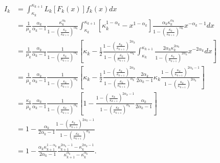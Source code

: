 \documentclass[12pt]{article}
\begin{document}
\begin{align*}
  I_k & = \int_{\kappa_k}^{\kappa_{k+1}}L_k[F_k(x)]f_k(x)dx \\
      & = \frac{1}{\mu_k}\frac{\alpha_k}{\alpha_k - 1}\frac{\kappa_k^{\alpha_k}}{1 - \left(\frac{\kappa_k}{\kappa_{k+1}}\right)^{\alpha_k}}\int_{\kappa_k}^{\kappa_{k+1}}\left[\kappa_k^{1-\alpha_k} - x^{1 - \alpha_k}\right]\frac{\alpha_k\kappa_k^{\alpha_k}}{1 - \left(\frac{\kappa_k}{\kappa_{k+1}}\right)^{\alpha_k}}x^{-\alpha_k - 1}dx \\
      & = \frac{1}{\mu_k}\frac{\alpha_k}{\alpha_k - 1}\frac{1}{1 - \left(\frac{\kappa_k}{\kappa_{k+1}}\right)^{\alpha_k}}\left[\kappa_k - \frac{1}{2}\frac{1 - \left(\frac{\kappa_k}{\kappa_{k+1}}\right)^{2\alpha_k}}{1 - \left(\frac{\kappa_k}{\kappa_{k+1}}\right)^{\alpha_k}}\int_{\kappa_k}^{\kappa_{k+1}}\frac{2\alpha_k\kappa_k^{2\alpha_k}}{1 - \left(\frac{\kappa_k}{\kappa_{k+1}}\right)^{2\alpha_k}}x^{-2\alpha_k}dx\right] \\
      & = \frac{1}{\mu_k}\frac{\alpha_k}{\alpha_k - 1}\frac{1}{1 - \left(\frac{\kappa_k}{\kappa_{k+1}}\right)^{\alpha_k}}\left[\kappa_k - \frac{1}{2}\frac{1 - \left(\frac{\kappa_k}{\kappa_{k+1}}\right)^{2\alpha_k}}{1 - \left(\frac{\kappa_k}{\kappa_{k+1}}\right)^{\alpha_k}}\frac{2\alpha_k}{2\alpha_k - 1}\kappa_k\frac{1 - \left(\frac{\kappa_k}{\kappa_{k+1}}\right)^{2\alpha_k - 1}}{1 - \left(\frac{\kappa_k}{\kappa_{k+1}}\right)^{2\alpha_k}}\right] \\
      & = \frac{\kappa_k}{\mu_k}\frac{\alpha_k}{\alpha_k - 1}\frac{1}{1 - \left(\frac{\kappa_k}{\kappa_{k+1}}\right)^{\alpha_k}}\left[1 - \frac{1 - \left(\frac{\kappa_k}{\kappa_{k+1}}\right)^{2\alpha_k - 1}}{1 - \left(\frac{\kappa_k}{\kappa_{k+1}}\right)^{\alpha_k}}\frac{\alpha_k}{2\alpha_k - 1}\right] \\
      & = 1 - \frac{\alpha_k}{2\alpha_k - 1}\frac{1 - \left(\frac{\kappa_k}{\kappa_{k+1}}\right)^{2\alpha_k - 1}}{1 - \left(\frac{\kappa_k}{\kappa_{k+1}}\right)^{\alpha_k}}\\
      & = 1 - \frac{\alpha_k\kappa_{k+1}^{1 - \alpha_k}}{2\alpha_k - 1}\frac{\kappa_{k+1}^{2\alpha_k - 1} - \kappa_k^{2\alpha_k - 1}}{\kappa_{k+1}^{\alpha_k} - \kappa_k^{\alpha_k}}.
\end{align*}
\end{document}
